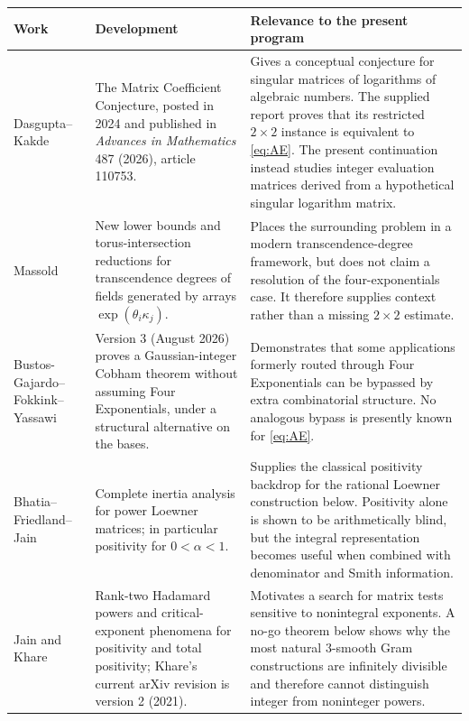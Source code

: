 \documentclass[11pt,oneside]{article}
\theoremstyle{definition}
\theoremstyle{remark}
\begin{document}
\begin{longtable}{@{}>{\raggedright\arraybackslash}p{}>{\raggedright\arraybackslash}p{}>{\raggedright\arraybackslash}p{}@{}}
\toprule
Work & Development & Relevance to the present program \\
\midrule
\endhead
Dasgupta--Kakde \cite{DasguptaKakde2026} & The Matrix Coefficient Conjecture, posted in 2024 and published in \emph{Advances in Mathematics} 487 (2026), article 110753. & Gives a conceptual conjecture for singular matrices of logarithms of algebraic numbers.  The supplied report proves that its restricted $2\times2$ instance is equivalent to \eqref{eq:AE}.  The present continuation instead studies integer evaluation matrices derived from a hypothetical singular logarithm matrix.\\
Massold \cite{Massold2025} & New lower bounds and torus-intersection reductions for transcendence degrees of fields generated by arrays $\exp(\theta_i\kappa_j)$. & Places the surrounding problem in a modern transcendence-degree framework, but does not claim a resolution of the four-exponentials case.  It therefore supplies context rather than a missing $2\times2$ estimate.\\
Bustos-Gajardo--Fokkink--Yassawi \cite{GaussianCobham2026} & Version 3 (August 2026) proves a Gaussian-integer Cobham theorem without assuming Four Exponentials, under a structural alternative on the bases. & Demonstrates that some applications formerly routed through Four Exponentials can be bypassed by extra combinatorial structure.  No analogous bypass is presently known for \eqref{eq:AE}.\\
Bhatia--Friedland--Jain \cite{BFJ2015} & Complete inertia analysis for power Loewner matrices; in particular positivity for $0<\alpha<1$. & Supplies the classical positivity backdrop for the rational Loewner construction below.  Positivity alone is shown to be arithmetically blind, but the integral representation becomes useful when combined with denominator and Smith information.\\
Jain \cite{Jain2020} and Khare \cite{KhareJKS} & Rank-two Hadamard powers and critical-exponent phenomena for positivity and total positivity; Khare's current arXiv revision is version 2 (2021). & Motivates a search for matrix tests sensitive to nonintegral exponents.  A no-go theorem below shows why the most natural $3$-smooth Gram constructions are infinitely divisible and therefore cannot distinguish integer from noninteger powers.\\

\end{longtable}
\end{document}
